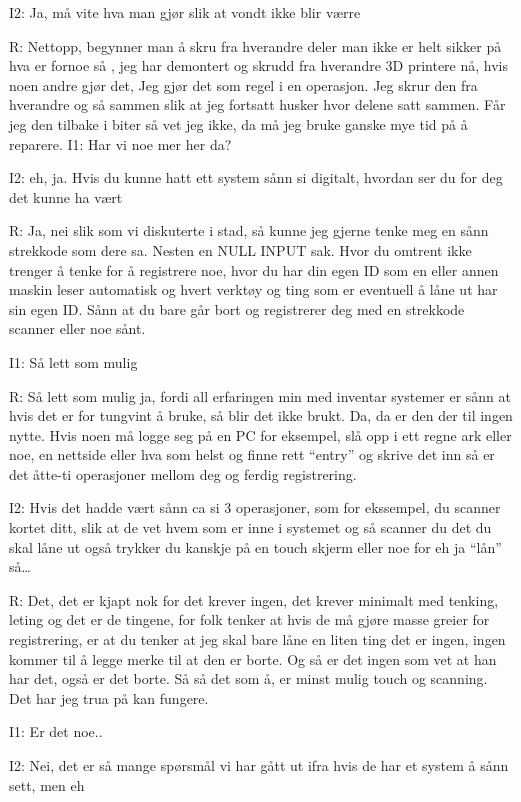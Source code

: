 I2: Ja, må vite hva man gjør slik at vondt ikke blir værre   

R: Nettopp, begynner man å skru fra hverandre deler man ikke er helt sikker på  hva er fornoe så , jeg har demontert og skrudd fra hverandre 3D printere nå, hvis noen andre gjør det, Jeg gjør det som regel i en operasjon. Jeg skrur den  fra hverandre og så sammen slik at jeg fortsatt husker hvor delene satt sammen. Får jeg den tilbake i biter så vet jeg ikke, da må jeg bruke ganske mye tid på å reparere.     
I1: Har vi noe mer her da?

I2: eh, ja. Hvis du kunne hatt ett system sånn si digitalt, hvordan ser du for deg det kunne ha vært

R: Ja, nei slik som vi diskuterte i stad, så kunne jeg gjerne tenke meg en sånn strekkode som dere sa. Nesten en NULL INPUT sak. Hvor du omtrent ikke trenger å tenke for å registrere noe, hvor du har din egen ID som en eller annen maskin leser automatisk og hvert verktøy og ting som er eventuell å låne ut har sin egen ID. Sånn at du bare går bort og registrerer deg med en strekkode scanner eller noe sånt.

I1: Så lett som mulig

R: Så lett som mulig ja, fordi all erfaringen min med  inventar systemer er sånn at hvis det er for tungvint å bruke, så blir det ikke brukt.  Da, da er den der til ingen nytte. Hvis noen må logge seg på en PC for eksempel, slå opp i ett regne ark eller noe, en nettside eller hva som helst og finne rett “entry”  og skrive det inn så er det åtte-ti operasjoner mellom deg og ferdig registrering.

I2: Hvis det hadde vært sånn ca si 3 operasjoner, som for ekssempel, du scanner kortet ditt, slik at de vet hvem som er inne i systemet og så scanner du det du skal låne ut også trykker du kanskje på en touch skjerm eller noe for eh ja “lån” så…

R: Det, det er kjapt nok for det krever ingen, det krever minimalt med tenking, leting og det er de tingene, for folk tenker at hvis de må gjøre masse greier for registrering, er at du tenker at jeg skal bare låne en liten ting det er ingen, ingen kommer til å legge merke til at den er borte. Og så er det ingen som vet at han har det, også er det borte. Så så det som å, er minst mulig touch og scanning. Det har jeg trua på kan fungere.

I1: Er det noe..

I2: Nei, det er så mange spørsmål vi har gått ut ifra hvis de har et system å sånn sett, men eh

